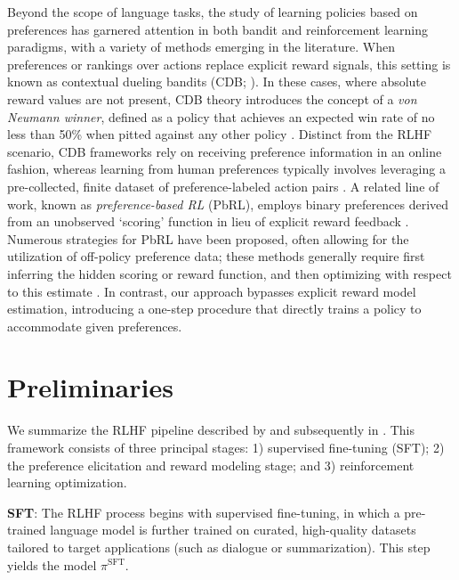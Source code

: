 Beyond the scope of language tasks, the study of learning policies based on preferences has garnered attention in both bandit and reinforcement learning paradigms, with a variety of methods emerging in the literature. When preferences or rankings over actions replace explicit reward signals, this setting is known as contextual dueling bandits (CDB; \cite{yue2012karmed,dudik2015contextual}). In these cases, where absolute reward values are not present, CDB theory introduces the concept of a \textit{von Neumann winner}, defined as a policy that achieves an expected win rate of no less than 50\% when pitted against any other policy \citep{dudik2015contextual}. Distinct from the RLHF scenario, CDB frameworks rely on receiving preference information in an online fashion, whereas learning from human preferences typically involves leveraging a pre-collected, finite dataset of preference-labeled action pairs \citep{yan2022human}. A related line of work, known as \textit{preference-based RL} (PbRL), employs binary preferences derived from an unobserved `scoring' function in lieu of explicit reward feedback \citep{BusaFekete2014,ruiz2023dueling}. Numerous strategies for PbRL have been proposed, often allowing for the utilization of off-policy preference data; these methods generally require first inferring the hidden scoring or reward function, and then optimizing with respect to this estimate \citep{jain2013learning,BusaFekete2014,christiano2017deep,sadigh2017active,kupcsik2018learning}. In contrast, our approach bypasses explicit reward model estimation, introducing a one-step procedure that directly trains a policy to accommodate given preferences.

\section{Preliminaries}\label{section:prelims}

We summarize the RLHF pipeline described by \citeauthor{ziegler2020finetuning} and subsequently in \citep{stiennon2022learning, bai2022training, ouyang2022training}. This framework consists of three principal stages: 1) supervised fine-tuning (SFT); 2) the preference elicitation and reward modeling stage; and 3) reinforcement learning optimization.

\textbf{SFT}: The RLHF process begins with supervised fine-tuning, in which a pre-trained language model is further trained on curated, high-quality datasets tailored to target applications (such as dialogue or summarization). This step yields the model $\pi^\text{SFT}$.

